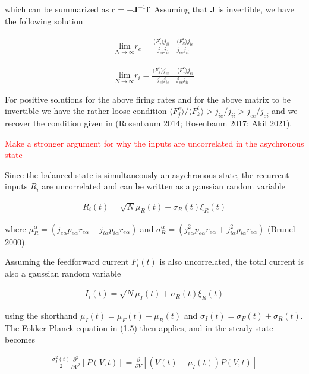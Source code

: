 \documentclass{ucetd}
\begin{document}
which can be summarized as $\mathbf{r} = -\mathbf{J}^{-1}\mathbf{f}$. Assuming that $\mathbf{J}$ is invertible, we have the following solution

\begin{align}
\underset{N\rightarrow \infty}{\mathrm{lim}}r_{e} = \frac{\langle F_{j}^{e}\rangle j_{ii}-\langle F_{k}^{i}\rangle j_{ie}}{j_{ei}j_{ie} - j_{ee}j_{ii}}
\end{align}

\begin{align}
\underset{N\rightarrow \infty}{\mathrm{lim}}r_{i} = \frac{\langle F_{k}^{i}\rangle j_{ee}-\langle F_{j}^{e}\rangle j_{ei}}{j_{ei}j_{ie} - j_{ee}j_{ii}}
\end{align}

For positive solutions for the above firing rates and for the above matrix to be invertible we have the rather loose condition $\langle F_{j}^{e}\rangle/\langle F_{k}^{i}\rangle > j_{ie}/j_{ii} > j_{ee}/j_{ei}$ and we recover the condition given in (Rosenbaum 2014; Rosenbaum 2017; Akil 2021). 

\textcolor{red}{Make a stronger argument for why the inputs are uncorrelated in the asychronous state}

Since the balanced state is simultaneously an asychronous state, the recurrent inputs $R_{i}$ are uncorrelated and can be written as a gaussian random variable

\begin{align*}
R_{i}(t) = \sqrt{N}\mu_{R}(t) + \sigma_{R}(t)\xi_{R}(t)
\end{align*}

where $\mu_{R}^{\alpha} = (j_{e\alpha}p_{e\alpha}r_{e\alpha} + j_{i\alpha}p_{i\alpha}r_{e\alpha})$ and $\sigma_{R}^{\alpha} = (j_{e\alpha}^{2}p_{e\alpha}r_{e\alpha} + j_{i\alpha}^{2}p_{i\alpha}r_{e\alpha})$ (Brunel 2000).


Assuming the feedforward current $F_{i}(t)$ is also uncorrelated, the total current is also a gaussian random variable 

\begin{align*}
I_{i}(t) = \sqrt{N}\mu_{I}(t) + \sigma_{R}(t)\xi_{R}(t)
\end{align*}


using the shorthand $\mu_{I}(t) = \mu_{F}(t) + \mu_{R}(t)$ and $\sigma_{I}(t) = \sigma_{F}(t) + \sigma_{R}(t)$. The Fokker-Planck equation in (1.5) then applies, and in the steady-state becomes

\begin{align}
\frac{\sigma_{I}^{2}(t)}{2}\frac{\partial^{2}}{\partial V^{2}}[P(V,t)] = \frac{\partial}{\partial V}[\left(V(t)-\mu_{I}(t)\right) P(V,t)]
\end{align}
\end{document}
